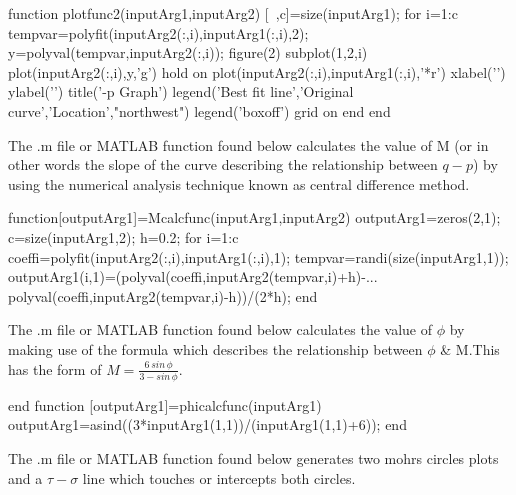 \documentclass{article}
\begin{document}
\begin{matlabcode}
function plotfunc2(inputArg1,inputArg2)
[~,c]=size(inputArg1);
for i=1:c
    tempvar=polyfit(inputArg2(:,i),inputArg1(:,i),2);
    y=polyval(tempvar,inputArg2(:,i));
    figure(2)
    subplot(1,2,i)
    plot(inputArg2(:,i),y,'g')
    hold on 
    plot(inputArg2(:,i),inputArg1(:,i),'*r')
    xlabel('\bfp')
    ylabel('\bfq')
    title('\bfq-p Graph')
    legend('Best fit line','Original curve','Location',"northwest")
    legend('boxoff')
    grid on 
end
end
\end{matlabcode}

\begin{par}
\begin{flushleft}
The .m file or MATLAB function found below calculates the value of M (or in other words the slope of the curve describing the relationship between $q-p$) by using the numerical analysis technique known as central difference method.
\end{flushleft}
\end{par}

\begin{matlabcode}
function[outputArg1]=Mcalcfunc(inputArg1,inputArg2)
outputArg1=zeros(2,1);
c=size(inputArg1,2);
h=0.2;
for i=1:c
    coeffi=polyfit(inputArg2(:,i),inputArg1(:,i),1);
    tempvar=randi(size(inputArg1,1));
    outputArg1(i,1)=(polyval(coeffi,inputArg2(tempvar,i)+h)-...
        polyval(coeffi,inputArg2(tempvar,i)-h))/(2*h);
end
\end{matlabcode}

\begin{par}
\begin{flushleft}
The .m file or MATLAB function found below calculates the value of $\phi$ by making use of the formula which  describes the relationship between $\phi$ \& M.This has the form of $M=\frac{6\,sin\,\phi}{3-sin\,\phi}$.
\end{flushleft}
\end{par}

\begin{matlabcode}
end
function [outputArg1]=phicalcfunc(inputArg1)
outputArg1=asind((3*inputArg1(1,1))/(inputArg1(1,1)+6));
end
\end{matlabcode}

\begin{par}
\begin{flushleft}
The .m file or MATLAB function found below generates two mohrs circles plots and a $\tau-\sigma$ line which touches or intercepts both circles.
\end{flushleft}
\end{par}
\end{document}
